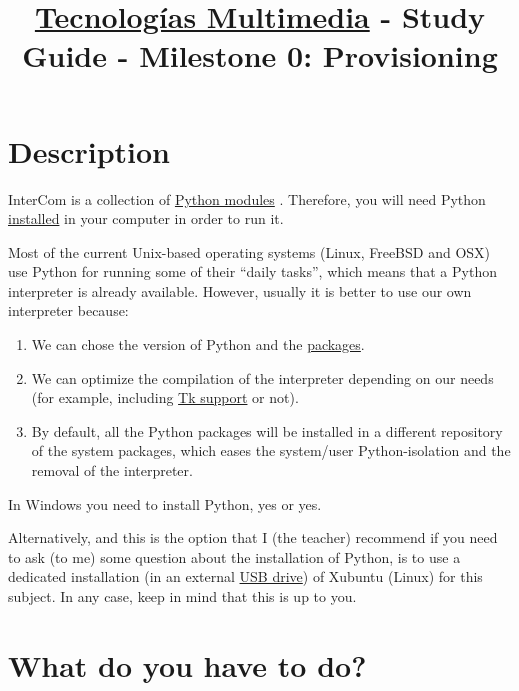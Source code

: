 \title{\href{https://www.ual.es/estudios/grados/presentacion/plandeestudios/asignatura/4015/40154321?idioma=zh_CN}{Tecnologías Multimedia} - Study Guide - Milestone 0: Provisioning}

\maketitle

\section{Description}

InterCom \cite{intercom} is a collection of
\href{https://docs.python.org/3/tutorial/modules.html#}{Python
  modules} \cite{python}. Therefore, you will need Python
\href{https://www.python.org/downloads/}{installed} in your computer
in order to run it.

Most of the current Unix-based operating systems (Linux, FreeBSD and
OSX) use Python for running some of their ``daily tasks'', which means
that a Python interpreter is already available. However, usually it is
better to use our own interpreter because:
\begin{enumerate}
\item We can chose the version of Python and the
  \href{https://docs.python.org/3/tutorial/modules.html#packages}{packages}.
\item We can optimize the compilation of the interpreter depending on
  our needs (for example, including
  \href{https://wiki.python.org/moin/TkInter}{Tk support} or not).
\item By default, all the Python packages will be installed in a
  different repository of the system packages, which eases the
  system/user Python-isolation and the removal of the interpreter.
\end{enumerate}
In Windows you need to install Python, yes or yes.

Alternatively, and this is the option that I (the teacher) recommend
if you need to ask (to me) some question about the installation of
Python, is to use a dedicated installation (in an external
\href{https://en.wikipedia.org/wiki/USB_flash_drive}{USB drive}) of
Xubuntu (Linux) \cite{xubuntu} for this subject. In any case, keep in
mind that this is up to you.

\section{What do you have to do?}

